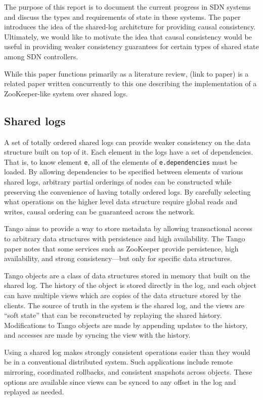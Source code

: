 \documentclass[letterpaper,twocolumn,10pt]{article}
\begin{document}
The purpose of this report is to document the current progress in SDN systems and discuss the types and requirements of state in these systems. The paper introduces the idea of the shared-log architcture for providing causal consistency. Ultimately, we would like to motivate the idea that causal consistency would be useful in providing weaker consistency guarantees for certain types of shared state among SDN controllers.

While this paper functions primarily as a literature review, (link to paper) is a related paper written concurrently to this one describing the implementation of a ZooKeeper-like system over shared logs.

\subsection{Shared logs}

A set of totally ordered shared logs can provide weaker consistency on the data structure built on top of it. Each element in the logs have a set of dependencies. That is, to know element \verb_e_, all of the elements of \verb_e.dependencies_ must be loaded.  By allowing dependencies to be specified between elements of various shared logs, arbitrary partial orderings of nodes can be constructed while preserving the convenience of having totally ordered logs. By carefully selecting what operations on the higher level data structure require global reads and writes, causal ordering can be guaranteed across the network.

Tango \cite{Tango} aims to provide a way to store metadata by allowing transactional access to arbitrary data structures with persistence and high availability. The Tango paper notes that some services such as ZooKeeper \cite{hunt2010zookeeper} provide persistence, high availability, and strong consistency---but only for specific data structures.

Tango objects are a class of data structures stored in memory that built on the shared log. The history of the object is stored directly in the log, and each object can have multiple views which are copies of the data structure stored by the clients. The source of truth in the system is the shared log, and the views are ``soft state'' that can be reconstructed by replaying the shared history. Modifications to Tango objects are made by appending updates to the history, and accesses are made by syncing the view with the history.

Using a shared log makes strongly consistent operations easier than they would be in a conventional distributed system. Such applications include remote mirroring, coordinated rollbacks, and consistent snapshots across objects. These options are available since views can be synced to any offset in the log and replayed as needed.
\end{document}
